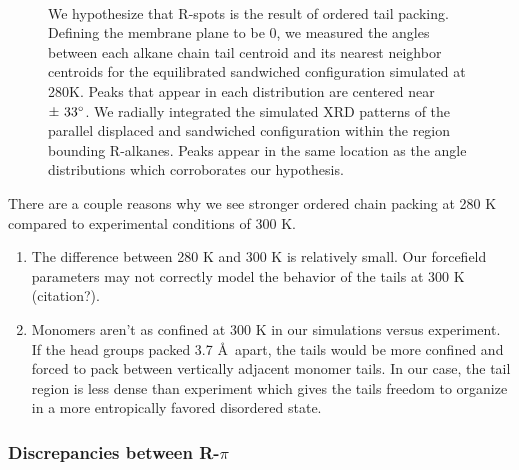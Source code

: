 \documentclass[journal=jpcbfk,manusciprt=article]{achemso}
\begin{document}
\begin{figure}[!htb]
\begin{subfigure}{\linewidth}
\begin{subfigure}{0.45\textwidth}
		\end{subfigure}
	\end{subfigure} 
    \caption{We hypothesize that R-spots is the result of ordered tail packing.
	  Defining the membrane plane to be 0\degree, we measured the angles between each
	  alkane chain tail centroid and its nearest neighbor centroids for the
	  equilibrated sandwiched configuration simulated at 280K. Peaks
	  that appear in each distribution are centered near $\pm~33\degree$. We radially
	  integrated the simulated XRD patterns of the parallel displaced and sandwiched
	  configuration within the region bounding R-alkanes.
	  Peaks appear in the same location as the angle distributions which corroborates
	  our hypothesis.}~\label{fig:tail_packing}
  \end{figure}  


  There are a couple reasons why we see stronger ordered chain packing at 280 K compared to
  experimental conditions of 300 K.
  \begin{enumerate}
  		\item The difference between 280 K and 300 K is relatively small. Our forcefield parameters
  		may not correctly model the behavior of the tails at 300 K (citation?).
  		\item Monomers aren't as confined at 300 K in our simulations versus experiment.
  		If the head groups packed 3.7 \AA~apart, the tails would be more confined and forced
  		to pack between vertically adjacent monomer tails. In our case, the tail region is
  		less dense than experiment which gives the tails freedom to organize in a more
  		entropically favored disordered state. 
  \end{enumerate}
  
  \subsubsection{Discrepancies between R-$\pi$}\label{section:rpi}
  
\end{document}
